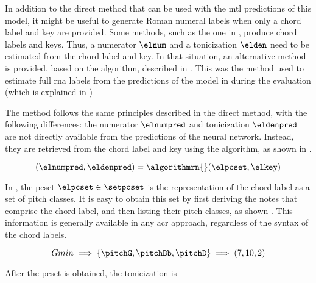 
In addition to the direct method that can be used with the
\gls{mtl} predictions of this model, it might be useful to
generate Roman numeral labels when only a chord label and
key are provided. Some methods, such as the one in
\textcite{mcleod2021modular}, produce chord labels and keys.
Thus, a numerator $\elnum$ and a tonicization $\elden$ need
to be estimated from the chord label and key. In that
situation, an alternative method is provided, based on the
\algorithmrn{} algorithm, described in
.
This was the method used to estimate full \gls{rna} labels
from the predictions of the model in
\textcite{mcleod2021modular, chen2021attend} during the
evaluation (which is explained in
)

The method follows the same principles described in the
direct method, with the following differences: the numerator
$\elnumpred$ and tonicization $\eldenpred$ are not directly
available from the predictions of the neural network.
Instead, they are retrieved from the chord label and key
using the \algorithmrn{} algorithm, as shown in
.

\begin{equation}
    \label{eq:calling_natem}
    (\elnumpred, \eldenpred) = \algorithmrn{}(\elpcset, \elkey) 
\end{equation}

In , the \gls{pcset} $\elpcset \in
\setpcset$ is the representation of the chord label as a set
of pitch classes. It is easy to obtain this set by first
deriving the notes that comprise the chord label, and then
listing their pitch classes, as shown
. This information is generally
available in any \gls{acr} approach, regardless of the
syntax of the chord labels.


\begin{equation}
    \label{eq:indirect_method_pcset}
    Gmin \implies \{\pitchG, \pitchBb, \pitchD\} \implies (7, 10, 2)
\end{equation} 

After the \gls{pcset} is obtained, the tonicization is
